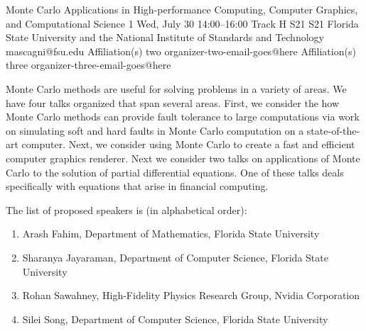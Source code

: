 \begin{talk}
  {Monte Carlo Applications in High-performance Computing, Computer Graphics, and Computational Science}%
  {1}%
  {}%
  {}%
  {}%
  {}%
  {Wed, July 30 14:00–16:00 Track H}%
  {S21}%
  {S21}%
  {%
    {Florida State University and the National Institute of Standards and Technology}%
    {mascagni@fsu.edu}}%
  {%
	{Affiliation(s) two}%
	{organizer-two-email-goes@here}}%
  {%
	{Affiliation(s) three}%
	{organizer-three-email-goes@here}}%

Monte Carlo methods are useful for solving problems in a variety of areas.  We have four talks organized that span several areas.  First, we consider the how Monte Carlo methods can provide fault tolerance to large computations via work on simulating soft and hard faults in Monte Carlo computation on a state-of-the-art computer.  Next, we consider using Monte Carlo to create a fast and efficient computer graphics renderer. Next we consider two talks on applications of Monte Carlo to the solution of partial differential equations.  One of these talks deals specifically with equations that arise in financial computing.

The list of proposed speakers is (in alphabetical order):
\begin{enumerate}
\item Arash Fahim, Department of Mathematics, Florida State University
\item Sharanya Jayaraman, Department of Computer Science, Florida State University
\item Rohan Sawahney, High-Fidelity Physics Research Group, Nvidia Corporation
\item Silei Song, Department of Computer Science, Florida State University
\end{enumerate}

\medskip



\end{talk}
